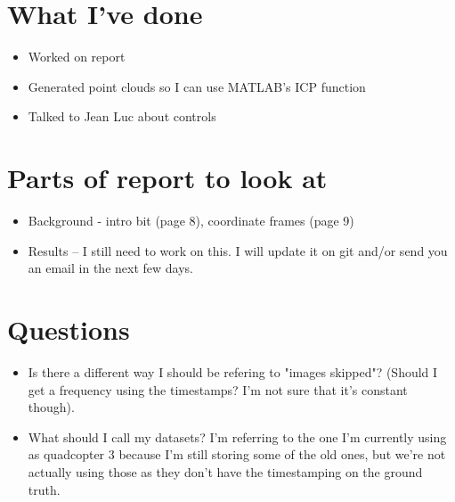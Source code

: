 \documentclass[12pt,a4paper]{article}
\begin{document}
\author{Katrina Ashton}


\pagestyle{fancy}
\fancyhf{}
\rhead{\thepage}

\section{What I've done}
\begin{itemize}
  \item Worked on report
  \item Generated point clouds so I can use MATLAB's ICP function
  \item Talked to Jean Luc about controls
\end{itemize}

\section{Parts of report to look at}
\begin{itemize}
\item Background - intro bit (page 8), coordinate frames (page 9)
\item Results -- I still need to work on this. I will update it on git and/or send you an email in the next few days.
\end{itemize}

\section{Questions}
\begin{itemize}
\item Is there a different way I should be refering to "images skipped"? (Should I get a frequency using the timestamps? I'm not sure that it's constant though).
\item What should I call my datasets? I'm referring to the one I'm currently using as quadcopter 3 because I'm still storing some of the old ones, but we're not actually using those as they don't have the timestamping on the ground truth.
\end{itemize}
\end{document}
